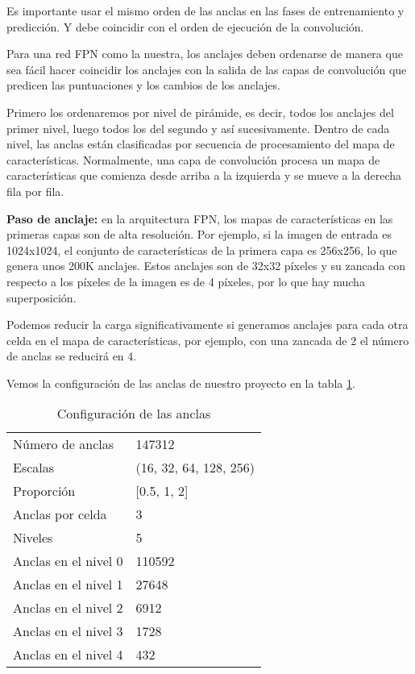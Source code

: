 Es importante usar el mismo orden de las anclas en las fases de entrenamiento y predicción. Y debe coincidir con el orden de ejecución de la convolución.

Para una red FPN como la nuestra, los anclajes deben ordenarse de manera que sea fácil hacer coincidir los anclajes con la salida de las capas de convolución que predicen las puntuaciones y los cambios de los anclajes.

Primero los ordenaremos por nivel de pirámide, es decir, todos los anclajes del primer nivel, luego todos los del segundo y así sucesivamente. Dentro de cada nivel, las anclas están clasificadas por secuencia de procesamiento del mapa de características. Normalmente, una capa de convolución procesa un mapa de características que comienza desde arriba a la izquierda y se mueve a la derecha fila por fila.

\textbf{Paso de anclaje:} en la arquitectura FPN, los mapas de características en las primeras capas son de alta resolución. Por ejemplo, si la imagen de entrada es 1024x1024, el conjunto de características de la primera capa es 256x256, lo que genera unos 200K anclajes. Estos anclajes son de 32x32 píxeles y su zancada con respecto a los píxeles de la imagen es de 4 píxeles, por lo que hay mucha superposición.

Podemos reducir la carga significativamente si generamos anclajes para cada otra celda en el mapa de características, por ejemplo, con una zancada de 2 el número de anclas se reducirá en 4.

Vemos la configuración de las anclas de nuestro proyecto en la tabla \ref{configuracionanclas}.

\begin{table}[h]
	\begin{center}
		\begin{tabular}{l l}
			Número de anclas & 147312\\
			Escalas & (16, 32, 64, 128, 256)\\
			Proporción & [0.5, 1, 2]\\
			Anclas por celda & 3\\
			Niveles & 5\\
			Anclas en el nivel 0 & 110592\\
			Anclas en el nivel 1 & 27648\\
			Anclas en el nivel 2 & 6912\\
			Anclas en el nivel 3 & 1728\\
			Anclas en el nivel 4 & 432\\
		\end{tabular}
		\caption{Configuración de las anclas}
		\label{configuracionanclas}
	\end{center}
\end{table}

